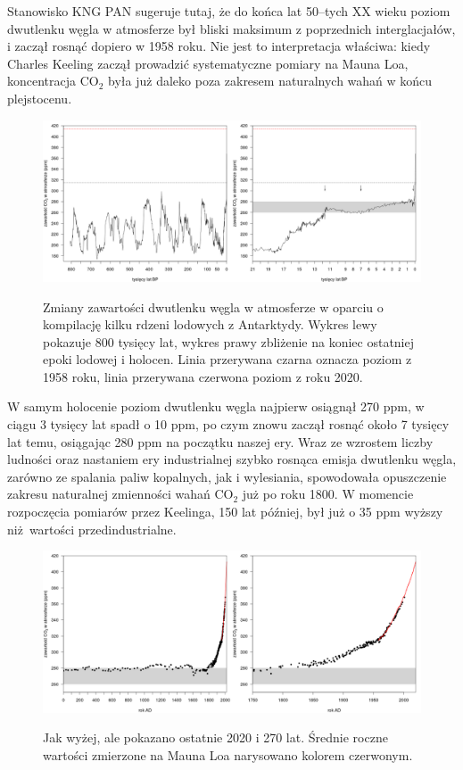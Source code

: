 \documentclass[12pt]{article}
\begin{document}
Stanowisko KNG PAN sugeruje tutaj, że do końca lat 50--tych XX wieku poziom dwutlenku węgla w atmosferze był bliski maksimum z poprzednich interglacjałów, i zaczął rosnąć dopiero w 1958 roku. Nie jest to interpretacja właściwa: kiedy Charles Keeling zaczął prowadzić systematyczne pomiary na Mauna Loa, koncentracja CO$_2$ była już daleko poza zakresem naturalnych wahań w końcu plejstocenu.

\begin{figure}
	\centering
	\includegraphics[width=.95\textwidth]{img/icecoreco2ab.png}
	
	\smallskip\noindent\small Zmiany zawartości dwutlenku węgla w atmosferze w oparciu o kompilację kilku rdzeni lodowych z Antarktydy. Wykres lewy pokazuje 800 tysięcy lat, wykres prawy zbliżenie na koniec ostatniej epoki lodowej i holocen. Linia przerywana czarna oznacza poziom z 1958 roku, linia przerywana czerwona poziom z roku 2020.
\end{figure}

W samym holocenie poziom dwutlenku węgla najpierw osiągnął 270 ppm, w ciągu 3 tysięcy lat spadł o 10 ppm, po czym znowu zaczął rosnąć około 7 tysięcy lat temu, osiągając 280 ppm na początku naszej ery. Wraz ze wzrostem liczby ludności oraz nastaniem ery industrialnej szybko rosnąca emisja dwutlenku węgla, zarówno ze spalania paliw kopalnych, jak i wylesiania, spowodowała opuszczenie zakresu naturalnej zmienności wahań CO$_2$ już po roku 1800. W momencie rozpoczęcia pomiarów przez Keelinga, 150 lat później, był już o 35 ppm wyższy niż wartości przedindustrialne.

\begin{figure}
	\centering
	
	\includegraphics[width=.95\textwidth]{img/icecoreco2cd.png}	
	
	\smallskip\noindent\small Jak wyżej, ale pokazano ostatnie 2020 i 270 lat. Średnie roczne wartości zmierzone na Mauna Loa narysowano kolorem czerwonym.
\end{figure}
		
\end{document}
